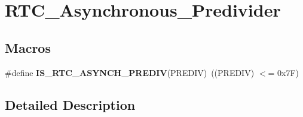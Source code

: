 \hypertarget{group___r_t_c___asynchronous___predivider}{}\section{R\+T\+C\+\_\+\+Asynchronous\+\_\+\+Predivider}
\label{group___r_t_c___asynchronous___predivider}
\subsection*{Macros}
\begin{DoxyCompactItemize}
\item 
\hypertarget{group___r_t_c___asynchronous___predivider_gac20f6c94ede2d474df8ba4acb7328d93}{}\#define {\bfseries I\+S\+\_\+\+R\+T\+C\+\_\+\+A\+S\+Y\+N\+C\+H\+\_\+\+P\+R\+E\+D\+I\+V}(P\+R\+E\+D\+I\+V)~((P\+R\+E\+D\+I\+V) $<$= 0x7\+F)\label{group___r_t_c___asynchronous___predivider_gac20f6c94ede2d474df8ba4acb7328d93}

\end{DoxyCompactItemize}


\subsection{Detailed Description}
